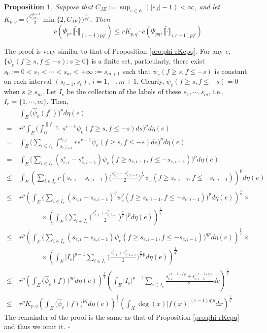 \documentclass[12pt,a4paper]{article}
\newtheorem{prop}[theorem]{Proposition}
\newenvironment{proof}{\medskip\noindent{\bf Proof. }}{\hfill$\square$\medskip}
\begin{document}
\begin{prop}
Suppose that $C_{JE}:=\sup_{e\in E}(|e_J|-1)<\infty$, and let $K_{p,q}=\big(\frac{C_{JE}^{p-1}}{2}\min \{2,C_{JE}\}\big)^{\frac{1}{pq'}}$. Then
$$c(\Psi_p,\widetilde{\llbracket \cdot\rrbracket}_{  (1-\frac1r)pq' })\le r   K_{p,q}\cdot  c(\Psi_{pq},\widetilde{\llbracket \cdot\rrbracket}_{(r-1)pq'})$$ 
\end{prop}
\begin{proof}The proof is very similar to that of Proposition \ref{pro:phi-rKcpq}. 
For any $e$, $\{\psi_e(f\ge s,f\le -s):s\ge0\}$ is a finite set, particularly, there exist $s_0:=0< s_1< \cdots< s_m< +\infty:=s_{m+1}$ such that $\psi_e(f\ge s,f\le -s)$ is constant on each interval $(s_{i-1},s_i)$, $i=1,\cdots,m+1$. Clearly, $\psi_e(f\ge s,f\le -s)=0$ when $s\ge s_m$. Let $I_e$ be the collection of the labels of   these $s_1,\cdots,s_m$, i.e., $I_e=\{1,\cdots,m\}$. 
Then,  %
\begin{align*}
&\int_E\big(\widehat{\psi}_e(f^r)\big)^pd\eta(e)
\\=~& r^p\int_E\Big(\int_0^{\|f\|_{\psi_e}} s^{r-1}\psi_e(f\ge s,f\le -s)ds\Big)^pd\eta(e)  \\=~& \int_E\Big(\sum_{i\in I_e} \int_{s_{e,i-1}}^{s_{e,i}}rs^{r-1}\psi_e(f\ge s,f\le -s)ds\Big)^pd\eta(e)
\\=~&\int_E\Big(\sum_{i\in I_e} (s_{e,i}^r-s_{e,i-1}^r)\psi_e(f\ge s_{e,i-1},f\le -s_{e,i-1})\Big)^pd\eta(e)
\\\le~&\int_E\left(\sum_{i\in I_e}r(s_{e,i}-s_{e,i-1})\big(\frac{s_{e,i}^r+s_{e,i-1}^r}{2}\big)^{\frac{1}{r'}}\psi_e(f\ge s_{e,i-1},f\le -s_{e,i-1})\right)^pd\eta(e)
\\ \le~&
r^p\left(\int_E\Big(\sum_{i\in I_e}(s_{e,i}-s_{e,i-1})^q\psi_e^q(f\ge s_{e,i-1},f\le -s_{e,i-1})\Big)^pd\eta(e)\right)^{\frac1q}\times
\\&~~~~~~~~~~~~~~\times
\left(\int_E\Big(\sum_{i\in I_e} \big(\frac{s_{e,i}^r+s_{e,i-1}^r}{2}\big)^{\frac{q'}{r'}}\Big)^pd\eta(e)\right)^{\frac{1}{q'}}
\\ \le~&
r^p \left(\int_E\Big(\sum_{i\in I_e}(s_{e,i}-s_{e,i-1})\psi_e(f\ge s_{e,i-1},f\le -s_{e,i-1})\Big)^{qp}d\eta(e)\right)^{\frac1q}\times
\\&~~~~~~~~~~~~~~\times
\left(\int_E |I_e|^{p-1}\sum_{i\in I_e} \big(\frac{s_{e,i}^r+s_{e,i-1}^r}{2}\big)^{\frac{q'}{r'}p}d\eta(e)\right)^{\frac{1}{q'}}
\\ \le~&
r^p \left(\int_E\Big(\widehat{\psi}_e(f)\Big)^{qp}d\eta(e)\right)^{\frac1q}
\left(\int_E|I_e|^{p-1}\sum_{i\in I_e} \frac{s_{e,i}^{(r-1)q'p}+s_{e,i-1}^{(r-1)q'p}}{2}de\right)^{\frac{1}{q'}}
\\ \le ~&
r^p K_{p,q}\left(\int_E\Big(\widehat{\psi}_e(f)\Big)^{pq}d\eta(e)\right)^{\frac1q}
\left(\int_X  \deg(x)|f(x)|^{(r-1)q'p}dx\right)^{\frac{1}{q'}}
\end{align*}
The remainder of the proof is the same as that of Proposition \ref{pro:phi-rKcpq} and thus we omit it.
\end{proof}
\end{document}
